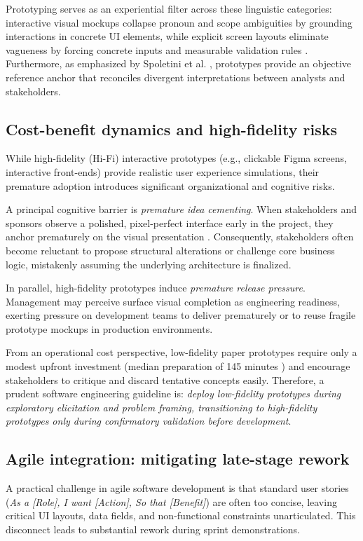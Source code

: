 \documentclass[conference]{IEEEtran}
\begin{document}
Prototyping serves as an experiential filter across these linguistic categories: interactive visual mockups collapse pronoun and scope ambiguities by grounding interactions in concrete UI elements, while explicit screen layouts eliminate vagueness by forcing concrete inputs and measurable validation rules \cite{ferrari2016ambiguity, cascon2025ambiguity}. Furthermore, as emphasized by Spoletini et al. \cite{spoletini2018interview}, prototypes provide an objective reference anchor that reconciles divergent interpretations between analysts and stakeholders.

\subsection{Cost-benefit dynamics and high-fidelity risks}
While high-fidelity (Hi-Fi) interactive prototypes (e.g., clickable Figma screens, interactive front-ends) provide realistic user experience simulations, their premature adoption introduces significant organizational and cognitive risks.

A principal cognitive barrier is \textit{premature idea cementing}. When stakeholders and sponsors observe a polished, pixel-perfect interface early in the project, they anchor prematurely on the visual presentation \cite{bjarnason2023empirically, gupta2022strategic}. Consequently, stakeholders often become reluctant to propose structural alterations or challenge core business logic, mistakenly assuming the underlying architecture is finalized.

In parallel, high-fidelity prototypes induce \textit{premature release pressure}. Management may perceive surface visual completion as engineering readiness, exerting pressure on development teams to deliver prematurely or to reuse fragile prototype mockups in production environments.

From an operational cost perspective, low-fidelity paper prototypes require only a modest upfront investment (median preparation of 145 minutes \cite{rueda2020requirements}) and encourage stakeholders to critique and discard tentative concepts easily. Therefore, a prudent software engineering guideline is: \textit{deploy low-fidelity prototypes during exploratory elicitation and problem framing, transitioning to high-fidelity prototypes only during confirmatory validation before development}.

\subsection{Agile integration: mitigating late-stage rework}
A practical challenge in agile software development is that standard user stories (\textit{As a [Role], I want [Action], So that [Benefit]}) are often too concise, leaving critical UI layouts, data fields, and non-functional constraints unarticulated. This disconnect leads to substantial rework during sprint demonstrations.
\end{document}
